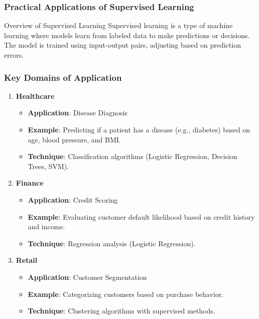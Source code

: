 \documentclass[aspectratio=169]{beamer}
\begin{document}
\begin{frame}[fragile]
    \frametitle{Practical Applications of Supervised Learning}
    \begin{block}{Overview of Supervised Learning}
        Supervised learning is a type of machine learning where models learn from labeled data to make predictions or decisions. 
        The model is trained using input-output pairs, adjusting based on prediction errors.
    \end{block}
\end{frame}

\begin{frame}[fragile]
    \frametitle{Key Domains of Application}
    \begin{enumerate}
        \item \textbf{Healthcare}
            \begin{itemize}
                \item \textbf{Application}: Disease Diagnosis
                \item \textbf{Example}: Predicting if a patient has a disease (e.g., diabetes) based on age, blood pressure, and BMI.
                \item \textbf{Technique}: Classification algorithms (Logistic Regression, Decision Trees, SVM).
            \end{itemize}

        \item \textbf{Finance}
            \begin{itemize}
                \item \textbf{Application}: Credit Scoring
                \item \textbf{Example}: Evaluating customer default likelihood based on credit history and income.
                \item \textbf{Technique}: Regression analysis (Logistic Regression).
            \end{itemize}

        \item \textbf{Retail}
            \begin{itemize}
                \item \textbf{Application}: Customer Segmentation
                \item \textbf{Example}: Categorizing customers based on purchase behavior.
                \item \textbf{Technique}: Clustering algorithms with supervised methods.
            \end{itemize}
    \end{enumerate}
\end{frame}
\end{document}
